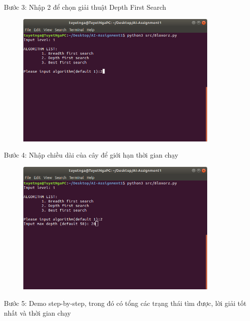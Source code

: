 \documentclass[a4paper]{article}
\begin{document}
\newpage
\begin{flushleft}
	\hspace{3 cm} Bước 3: Nhập 2 để chọn giải thuật Depth First Search
\end{flushleft}
\begin{center}
	\begin{figure}[htp]
		\begin{center}
			\includegraphics[width=10cm]{Images/depth3.png}
		\end{center}
		\caption{\label{fig:depth3}}
	\end{figure}
\end{center}
\begin{flushleft}
	\hspace{2 cm}	Bước 4: Nhập chiều dài của cây để giới hạn thời gian chạy
\end{flushleft}
\begin{center}
	\begin{figure}[htp]
		\begin{center}
			\includegraphics[width=10cm]{Images/depth4.png}
		\end{center}
		\caption{\label{fig:depth4}}
	\end{figure}
\end{center}
\newpage
\begin{flushleft}
	\hspace{2 cm}	Bước 5: Demo step-by-step, trong đó có tổng các trạng thái tìm được, lời giải tốt nhất và thời gian chạy
\end{flushleft}
\end{document}
